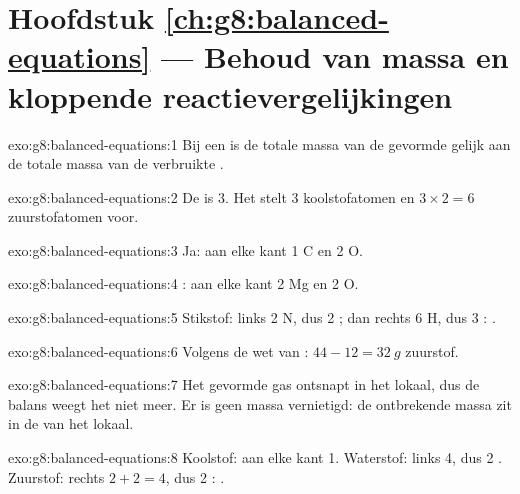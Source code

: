 \section*{Hoofdstuk \ref{ch:g8:balanced-equations} --- Behoud van massa en kloppende reactievergelijkingen}

\begin{solution}{exo:g8:balanced-equations:1}
Bij een  is de totale massa van de gevormde
 gelijk aan de totale massa van de verbruikte
.
\end{solution}

\begin{solution}{exo:g8:balanced-equations:2}
De  is 3. Het stelt 3 koolstofatomen en $3 \times 2 = 6$
zuurstofatomen voor.
\end{solution}

\begin{solution}{exo:g8:balanced-equations:3}
Ja: aan elke kant 1 C en 2 O.
\end{solution}

\begin{solution}{exo:g8:balanced-equations:4}
: aan elke kant 2 Mg en 2 O.
\end{solution}

\begin{solution}{exo:g8:balanced-equations:5}
Stikstof: links 2 N, dus 2 ; dan rechts 6 H, dus 3
: .
\end{solution}

\begin{solution}{exo:g8:balanced-equations:6}
Volgens de wet van : $44 - 12 = \qty{32}{g}$ zuurstof.
\end{solution}

\begin{solution}{exo:g8:balanced-equations:7}
Het gevormde gas ontsnapt in het lokaal, dus de balans weegt het niet
meer. Er is geen massa vernietigd: de ontbrekende massa zit in de 
van het lokaal.
\end{solution}

\begin{solution}{exo:g8:balanced-equations:8}
Koolstof: aan elke kant 1. Waterstof: links 4, dus 2 . Zuurstof:
rechts $2 + 2 = 4$, dus 2 :
.
\end{solution}

